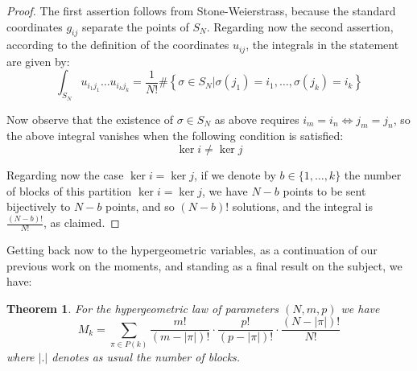 \documentclass[12pt]{amsbook}
\newtheorem{theorem}{Theorem}[chapter]
\begin{document}
\begin{proof}
The first assertion follows from Stone-Weierstrass, because the standard coordinates $g_{ij}$ separate the points of $S_N$. Regarding now the second assertion, according to the definition of the coordinates $u_{ij}$, the integrals in the statement are given by:
$$\int_{S_N}u_{i_1j_1}\ldots u_{i_kj_k}=\frac{1}{N!}\#\left\{\sigma\in S_N\Big|\sigma(j_1)=i_1,\ldots,\sigma(j_k)=i_k\right\}$$

Now observe that the existence of $\sigma\in S_N$ as above requires $i_m=i_n\iff j_m=j_n$, so the above integral vanishes when the following condition is satisfied:
$$\ker i\neq\ker j$$

Regarding now the case $\ker i=\ker j$, if we denote by $b\in\{1,\ldots,k\}$ the number of blocks of this partition $\ker i=\ker j$, we have $N-b$ points to be sent bijectively to $N-b$ points, and so $(N-b)!$ solutions, and the integral is $\frac{(N-b)!}{N!}$, as claimed.
\end{proof}

Getting back now to the hypergeometric variables, as a continuation of our previous work on the moments, and standing as a final result on the subject, we have:


\begin{theorem}
For the hypergeometric law of parameters $(N,m,p)$ we have
$$M_k=\sum_{\pi\in P(k)}\frac{m!}{(m-|\pi|)!}\cdot\frac{p!}{(p-|\pi|)!}\cdot\frac{(N-|\pi|)!}{N!}$$
where $|.|$ denotes as usual the number of blocks.
\end{theorem}
\end{document}
